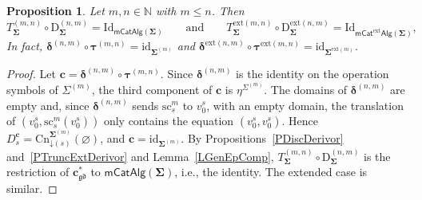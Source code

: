\documentclass{amsart}
\newcommand{\vs}[1]{\mathbin{\downarrow}#1}
\theoremstyle{plain}
\newtheorem{proposition}[theorem]{Proposition}
\theoremstyle{definition}
\begin{document}
\begin{proposition}\label{PTruncDisc}
Let $m,n\in\mathbb{N}$ with $m\leq n$. Then
$$
T^{(m,n)}_{\mathbf{\Sigma}}\circ\mathrm{D}^{(n,m)}_{\mathbf{\Sigma}}=\mathrm{Id}_{\mathsf{mCatAlg}(\mathbf{\Sigma})}
\qquad\text{and}\qquad
T^{\mathrm{ext}(m,n)}_{\mathbf{\Sigma}}\circ\mathrm{D}^{\mathrm{ext}(n,m)}_{\mathbf{\Sigma}}=\mathrm{Id}_{\mathsf{mCat}^{\mathrm{ext}}\mathsf{Alg}(\mathbf{\Sigma})},
$$
In fact, $\boldsymbol{\delta}^{(n,m)}\circ\boldsymbol{\tau}^{(m,n)}=\mathrm{id}_{\mathbf{\Sigma}^{(m)}}$ and $\boldsymbol{\delta}^{\mathrm{ext}(n,m)}\circ\boldsymbol{\tau}^{\mathrm{ext}(m,n)}=\mathrm{id}_{\mathbf{\Sigma}^{\mathrm{ext}(m)}}$.
\end{proposition}
\begin{proof}
Let $\mathbf{c}=\boldsymbol{\delta}^{(n,m)}\circ\boldsymbol{\tau}^{(m,n)}$. Since $\boldsymbol{\delta}^{(n,m)}$ is the identity on the operation symbols of $\Sigma^{(m)}$, the third component of $\mathbf{c}$ is $\eta^{\Sigma^{(m)}}$. The domains of $\boldsymbol{\delta}^{(n,m)}$ are empty and, since $\boldsymbol{\delta}^{(n,m)}$ sends $\mathrm{sc}^{m}_{s}$ to $v^{s}_{0}$, with an empty domain, the translation of $(v^{s}_{0},\mathrm{sc}^{m}_{s}(v^{s}_{0}))$ only contains the equation $(v^{s}_{0},v^{s}_{0})$. Hence $D^{\mathbf{c}}_{s}=\mathrm{Cn}^{\mathbf{\Sigma}^{(m)}}_{\vs{(s)}}(\varnothing)$, and $\mathbf{c}=\mathrm{id}_{\mathbf{\Sigma}^{(m)}}$. By Propositions~\ref{PDiscDerivor} and~\ref{PTruncExtDerivor} and Lemma~\ref{LGenEpComp}, $T^{(m,n)}_{\mathbf{\Sigma}}\circ\mathrm{D}^{(n,m)}_{\mathbf{\Sigma}}$ is the restriction of $\mathbf{c}^{\ast}_{\mathfrak{gd}}$ to $\mathsf{mCatAlg}(\mathbf{\Sigma})$, i.e., the identity. The extended case is similar.
\end{proof}
\end{document}
